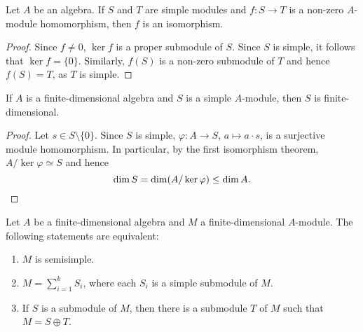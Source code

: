 
\begin{lemma}[Schur]
	Let $A$ be an algebra. If $S$ and $T$ are
	simple modules and $f\colon S\to T$ is a non-zero $A$-module homomorphism, 
	then $f$ is an isomorphism. 
\end{lemma}

\begin{proof}
Since $f\ne 0$, $\ker f$ is a proper submodule of $S$. Since $S$ is simple, it follows 
that $\ker f=\{0\}$. Similarly, $f(S)$ 
is a non-zero submodule of $T$ and hence $f(S)=T$, as $T$ is simple. 	
\end{proof}

\begin{proposition}
    If $A$ is a finite-dimensional algebra and $S$ is a simple $A$-module, then $S$ is finite-dimensional. 
\end{proposition}

\begin{proof}
    Let $s\in S\setminus\{0\}$. Since $S$ is simple, $\varphi\colon A\to S$, $a\mapsto a\cdot s$, is a surjective 
    module homomorphism. 
    In particular, by the first isomorphism theorem, 
    $A/\ker\varphi\simeq S$ and hence 
    \[
    \dim S=\dim (A/\ker\varphi)\leq \dim A.\qedhere
    \]
\end{proof}

\begin{proposition}
\label{pro:semisimple}
	Let $A$ be a finite-dimensional algebra and $M$ a finite-dimensional $A$-module. The following statements are equivalent:
	\begin{enumerate}
		\item $M$ is semisimple.
		\item $M=\sum_{i=1}^k S_i$, where each $S_i$ is a simple submodule of $M$. 
		\item If $S$ is a submodule of $M$, then there is a submodule $T$ of $M$ such that $M=S\oplus T$.    
	\end{enumerate}
\end{proposition}

